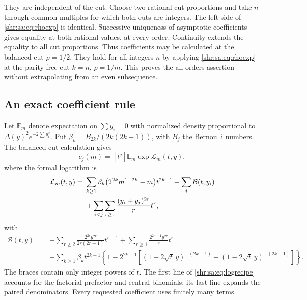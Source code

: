 \documentclass[11pt,letterpaper]{article}
\numberwithin{equation}{section}
\theoremstyle{definition}
\newcommand{\E}{\mathbb E}
\newcommand{\1}{\mathbf 1}
\newcommand{\coef}[2]{[#1^{#2}]}
\newcommand{\D}{\Delta}
\begin{document}
They are independent of the cut. Choose two rational cut proportions and take $n$ through common multiples for which both cuts are integers. The left side of \eqref{shr:sa:eq:rhoexp} is identical. Successive uniqueness of asymptotic coefficients gives equality at both rational values, at every order. Continuity extends the equality to all cut proportions. Thus coefficients may be calculated at the balanced cut $\rho=1/2$. They hold for all integers $n$ by applying \eqref{shr:sa:eq:rhoexp} at the parity-free cut $k=n$, $\rho=1/m$. This proves the all-orders assertion without extrapolating from an even subsequence.

\subsection{An exact coefficient rule}
Let $\E_m$ denote expectation on $\sum y_i=0$ with normalized density proportional to
$\D(y)^2e^{-2\sum y_i^2}$. Put
$\beta_k=B_{2k}/(2k(2k-1))$, with $B_j$ the Bernoulli numbers. The balanced-cut calculation gives
\begin{equation}\label{shr:sa:eq:recipe}
 c_j(m)=\coef tj\E_m\exp\mathcal L_m(t,y),
\end{equation}
where the formal logarithm is
\begin{align}
 \mathcal L_m(t,y)={}&
 \sum_{k\ge1}\beta_k\bigl(2^{2k}m^{1-2k}-m\bigr)t^{2k-1}
 +\sum_i\mathcal B(t,y_i)\notag\\
 &+\sum_{i<j}\sum_{r\ge1}\frac{(y_i+y_j)^{2r}}r t^r,\label{shr:sa:eq:logrecipe}
\end{align}
with
\begin{align*}
 \mathcal B(t,y)={}&-\sum_{r\ge2}
       \frac{2^{2r}y^{2r}}{2r(2r-1)}t^{r-1}
       +\sum_{r\ge1}\frac{2^{2r-1}y^{2r}}r t^r\\
 &+\sum_{k\ge1}\beta_k t^{2k-1}
 \left\{1-2^{2k-1}\left[(1+2\sqrt t\,y)^{-(2k-1)}
                         +(1-2\sqrt t\,y)^{-(2k-1)}\right]\right\}.
\end{align*}
The braces contain only integer powers of $t$. The first line of \eqref{shr:sa:eq:logrecipe} accounts for the factorial prefactor and central binomials; its last line expands the paired denominators. Every requested coefficient uses finitely many terms.
\end{document}
